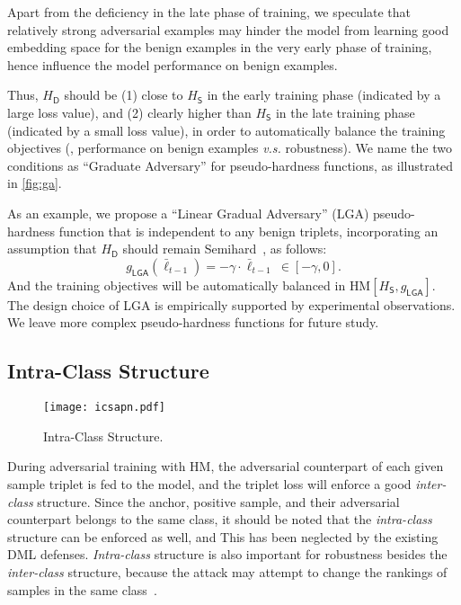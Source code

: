 \documentclass[10pt,twocolumn,letterpaper]{article}
\begin{document}

Apart from the deficiency in the late phase of training, we speculate that
relatively strong adversarial examples may hinder the model from 
learning good embedding space for the benign examples in the very early phase
of training, hence influence the model performance on benign examples.


Thus, $H_\mathsf{D}$ should be (1) close to $H_\mathsf{S}$ in the
early training phase (indicated by a large loss value), and (2) clearly higher
than $H_\mathsf{S}$ in the late training phase (indicated by a small loss
value),
%
in order to automatically balance the training objectives (\ie, performance
on benign examples \emph{v.s.} robustness).
%
We name the two conditions as ``Graduate Adversary'' for 
pseudo-hardness functions, as illustrated in \cref{fig:ga}.


As an example, we propose a ``Linear Gradual Adversary'' (LGA) pseudo-hardness
function that is independent to any benign triplets, incorporating an
assumption that $H_\mathsf{D}$ should remain Semihard~\cite{facenet}, as
follows:
%
\begin{equation}
	g_\mathsf{LGA}(\bar{\ell}_{t-1}) = -\gamma \cdot \bar{\ell}_{t-1} ~ \in
	[-\gamma,0].
\end{equation}
%
And the training objectives will be automatically balanced in
$\text{HM}[H_\mathsf{S},g_\mathsf{LGA}]$.
%
The design choice of LGA is empirically supported by experimental observations.
%
We leave more complex pseudo-hardness functions for future study.
%

\subsection{Intra-Class Structure}
\label{sec:33}

\begin{figure}[t]
	\texttt{[image: icsapn.pdf]}
	\caption{Intra-Class Structure.}
	\label{fig:ics}
\end{figure}


During adversarial training with HM, the adversarial counterpart of each given sample
triplet is fed to the model, and the triplet loss will enforce a good
\emph{inter-class} structure.
%
Since the anchor, positive sample, and their adversarial counterpart belongs to
the same class, it should be noted that the \emph{intra-class} structure can be
enforced as well, and This has been neglected by the existing DML defenses.
%
\emph{Intra-class} structure is also important for robustness besides the
\emph{inter-class} structure, because the attack may attempt to change the
rankings of samples in the same class~\cite{advrank}.
\end{document}
